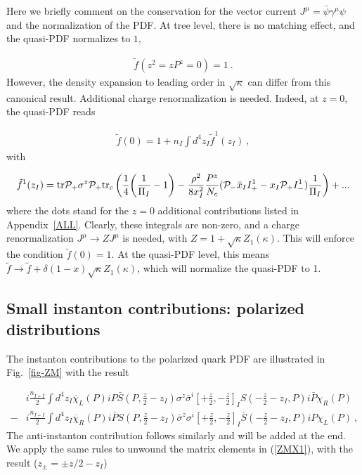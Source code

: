\documentclass[11pt,aps,amsmath,amssymb,nofootinbib,notitlepage,longbibliography]{revtex4-1}
\begin{document}
Here we briefly comment on the conservation for the vector current $J^{\mu}=\bar\psi \gamma^{\mu}\psi$ and the normalization of the
PDF. At tree level, there is no matching effect, and the quasi-PDF normalizes to  $1$,

\begin{align}
\tilde f(z^2=zP^z=0)=1 \ .
\end{align}
However, the density expansion to leading order in $\sqrt{\kappa}$
 can differ from this canonical result. Additional charge renormalization is needed. Indeed, at $z=0$, the quasi-PDF reads

\begin{align}
\tilde f(0)=1+n_I\int d^4 z_I \tilde f^1(z_I)\ ,
\end{align}
with

\begin{align}
\tilde f^1(z_I)={\rm tr}{\cal P}_+ \sigma^z {\cal P}_+ {\rm tr}_c\left(\frac{1}{4}\bigg(\frac{1}{{\Pi_I}}-1\bigg)
-\frac{\rho^2}{8x_I^2}\frac{P^z}{N_c}({\cal P}_-\bar x_I I_+^1-x_I {\cal P}_+I_-^1)\frac{1}{\Pi_I}\right)+...
\end{align}
where the dots stand for the $z=0$ additional contributions listed in Appendix~\ref{ALL}.
Clearly, these integrals are non-zero, and a charge renormalization  $J^{\mu}\rightarrow Z J^{\mu}$ is needed, with
 $Z=1+\sqrt\kappa Z_1(\kappa)$. This will enforce  the condition $\tilde f(0)=1$. At the quasi-PDF level, this means $\tilde f\rightarrow \tilde f+\delta(1-x)\sqrt\kappa Z_1(\kappa)$, which will  normalize the quasi-PDF to 1.








\subsection{Small instanton contributions: polarized distributions}
\label{sec_polarized}


The instanton contributions to the polarized quark PDF are illustrated in Fig.~\ref{fig-ZM} with the result


\begin{align}\label{ZMX1}
&i\frac{n_{I+\bar I}}{2}\int d^4z_{I}\overline\chi_L(P)iP{\bar S}(P,\frac{z}{2}-z_I)  \sigma^z\bar \sigma^i[+\frac{z}{2},-\frac{z}{2}]_I{S}(-\frac{z}{2}-z_I,P)i\bar P\chi_R(P)\nonumber \\
-&i\frac{n_{I+\bar I}}{2}\int d^4z_{I}\overline\chi_R(P)i \bar P{S}(P,\frac{z}{2}-z_I)\bar \sigma^z\sigma^i[+\frac{z}{2},-\frac{z}{2}]_{I}{\bar S}(-\frac{z}{2}-z_I,P)i P\chi_L(P) \ ,
\end{align}
The anti-instanton contribution follows similarly and will be added at the end. We apply the same rules to unwound the matrix elements in (\ref{ZMX1}),
with the result ($z_\pm =\pm z/2-z_I$)
\end{document}
